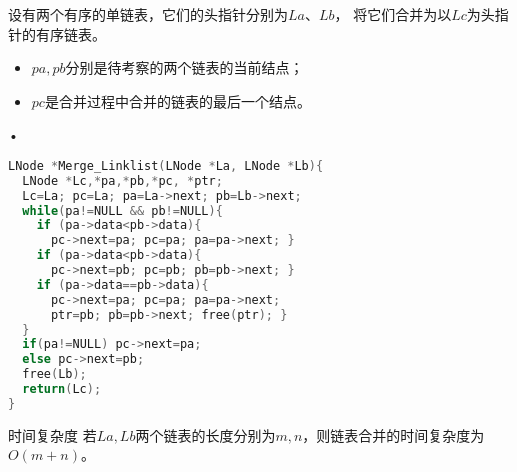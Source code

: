 \begin{frame}[fragile]

 
 
\end{frame}


\begin{frame}
设有两个有序的单链表，它们的头指针分别为$La$、$Lb$，
将它们合并为以$Lc$为头指针的有序链表。 
 
\end{frame}


\begin{frame}
  
 

\pause 
\begin{itemize}
\item $pa,pb$分别是待考察的两个链表的当前结点；
\item $pc$是合并过程中合并的链表的最后一个结点。
\end{itemize}•
\end{frame}


\begin{frame}[fragile]
\begin{lstlisting}[language=C]
LNode *Merge_Linklist(LNode *La, LNode *Lb){
  LNode *Lc,*pa,*pb,*pc, *ptr; 
  Lc=La; pc=La; pa=La->next; pb=Lb->next;
  while(pa!=NULL && pb!=NULL){
    if (pa->data<pb->data){
      pc->next=pa; pc=pa; pa=pa->next; }
    if (pa->data<pb->data){
      pc->next=pb; pc=pb; pb=pb->next; }
    if (pa->data==pb->data){
      pc->next=pa; pc=pa; pa=pa->next;
      ptr=pb; pb=pb->next; free(ptr); }
  }
  if(pa!=NULL) pc->next=pa;
  else pc->next=pb;
  free(Lb);
  return(Lc);
}
\end{lstlisting}
\end{frame}


\begin{frame}[fragile]
\begin{block}{时间复杂度}
若$La,Lb$两个链表的长度分别为$m,n$，则链表合并的时间复杂度为$O(m+n)$。
\end{block}
\end{frame}
